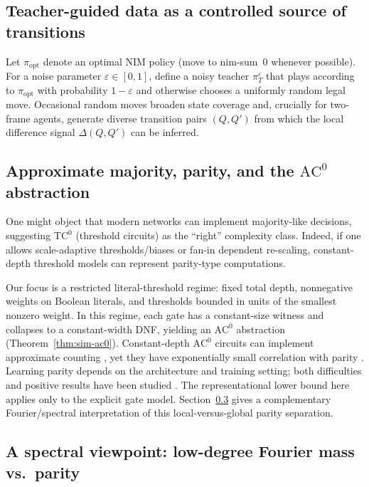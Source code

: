 \documentclass[twoside,11pt]{article}
\newcommand{\AC}{\mathrm{AC}}
\newcommand{\TC}{\mathrm{TC}}
\numberwithin{theorem}{section}
\numberwithin{equation}{section}
\begin{document}
\subsection{Teacher-guided data as a controlled source of transitions}
\label{sec:teacher}

Let $\pi_{\mathrm{opt}}$ denote an optimal NIM policy (move to nim-sum~$0$ whenever possible).
For a noise parameter $\varepsilon\in[0,1]$, define a noisy teacher $\pi_T^{\varepsilon}$ that plays according to $\pi_{\mathrm{opt}}$ with probability $1-\varepsilon$ and otherwise chooses a uniformly random legal move.
Occasional random moves broaden state coverage and, crucially for two-frame agents, generate diverse transition pairs $(Q,Q')$ from which the local difference signal $\Delta(Q,Q')$ can be inferred.

\subsection{Approximate majority, parity, and the \texorpdfstring{$\AC^0$}{AC0} abstraction}
\label{sec:majority-vs-parity}

One might object that modern networks can implement majority-like decisions, suggesting $\TC^0$ (threshold circuits) as the ``right'' complexity class.
Indeed, if one allows scale-adaptive thresholds/biases or fan-in dependent re-scaling, constant-depth threshold models can represent parity-type computations.

Our focus is a restricted literal-threshold regime: fixed total depth, nonnegative weights on Boolean literals, and thresholds bounded in units of the smallest nonzero weight.
In this regime, each gate has a constant-size witness and collapses to a constant-width DNF, yielding an $\AC^0$ abstraction (Theorem~\ref{thm:sim-ac0}).
Constant-depth $\AC^0$ circuits can implement approximate counting \citep{ajtai1993approxcount}, yet they have exponentially small correlation with parity \citep{furst1984parity,hastad1986thesis,smolensky1987algebraic,razborov1987lower}.
Learning parity depends on the architecture and training setting; both difficulties and positive results have been studied \citep{thornton1996parity,thornton1996bp,daniely2020parities}. The representational lower bound here applies only to the explicit gate model.
Section~\ref{sec:spectral-view} gives a complementary Fourier/spectral interpretation of this local-versus-global parity separation.

\subsection{A spectral viewpoint: low-degree Fourier mass vs.\ parity}
\label{sec:spectral-view}
\end{document}
